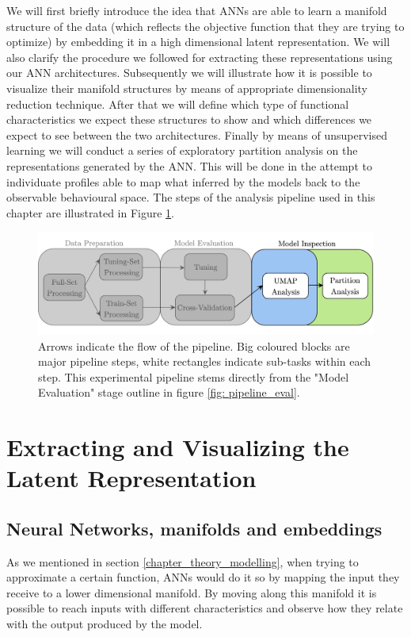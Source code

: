 We will first briefly introduce the idea that ANNs are able to learn a manifold structure of the data (which reflects the objective function that they are trying to optimize) by embedding it in a high dimensional latent representation. We will also clarify the procedure we followed for extracting these representations using our ANN architectures. Subsequently we will illustrate how it is possible to visualize their manifold structures by means of appropriate dimensionality reduction technique.  After that we will define which type of functional characteristics we expect these structures to show  and which differences we expect to see between the two architectures. Finally by means of unsupervised learning we will conduct a series of exploratory partition analysis on the representations generated by the ANN. This will be done in the attempt to individuate profiles able to map what inferred by the models back to the observable behavioural space. The steps of the analysis pipeline used in this chapter are illustrated in Figure \ref{fig: pipeline_inspect}.
\begin{figure}[h]
  \centering
  \includegraphics[width=\textwidth]{images/chapter_4/pipeline_inspect.png}
    \caption[\textbf{Representation analysis experimental pipeline}]{Arrows indicate the flow of the pipeline. Big coloured blocks are major pipeline steps, white rectangles indicate sub-tasks within each step. This experimental pipeline stems directly from the "Model Evaluation" stage outline in figure \ref{fig: pipeline_eval}.}
    \label{fig: pipeline_inspect}
\end{figure}

\section{Extracting and Visualizing the Latent Representation}
\label{extract_visulize}

\subsection{Neural Networks, manifolds and embeddings}
\label{manifold_learning_embed}
As we mentioned in section \ref{chapter_theory_modelling}, when trying to approximate a certain function, ANNs would do it so by mapping the input they receive to a lower dimensional manifold. By moving along this manifold it is possible to reach inputs with different characteristics and observe how they relate with the output produced by the model.

